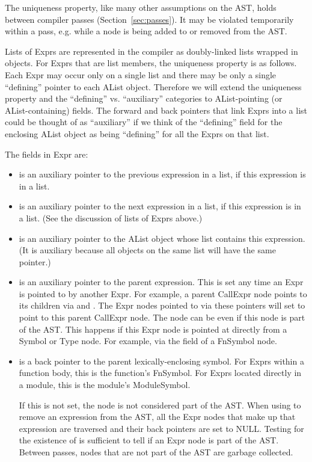 \documentclass[10pt]{article}
\begin{document}
The uniqueness property, like many other assumptions on the AST, holds
between compiler passes (Section~\ref{sec:passes}).  It may be
violated temporarily within a pass, e.g. while a node is being added
to or removed from the AST.

Lists of Exprs are represented in the compiler as doubly-linked lists
wrapped in  objects.  For Exprs that are list members, the
uniqueness property is as follows.  Each Expr may occur only on a
single list and there may be only a single ``defining'' pointer to
each AList object.  Therefore we will extend the uniqueness property
and the ``defining'' vs. ``auxiliary'' categories to AList-pointing
(or AList-containing)
fields.  The forward and back pointers that link Exprs into a list
could be thought of as ``auxiliary'' if we think of the ``defining''
field for the enclosing AList object as being ``defining'' for all
the Exprs on that list.

The fields in Expr are:
\begin{itemize}
\item {} is an auxiliary pointer to the previous expression in
  a list, if this expression is in a list.
\item {} is an auxiliary pointer to the next expression in a list,
  if this expression is in a list. (See the discussion of lists of Exprs above.)
\item {} is an auxiliary pointer to the AList object
  whose list contains this expression.  (It is auxiliary because all
  objects on the same list will have the same  pointer.)
\item {} is an auxiliary pointer to the parent
  expression.  This is set any time an Expr is pointed to by another
  Expr.  For example, a parent CallExpr node points to its children
  via  and .  The Expr nodes pointed to via
  these pointers will set  to point to this parent
  CallExpr node.  The  node can be  even if
  this node is part of the AST.  This happens if this Expr node is
  pointed at directly from a Symbol or Type node.  For example, via
  the  field of a FnSymbol node.
\item {} is a back pointer to the parent
  lexically-enclosing symbol.  For Exprs within a function body,
  this is the function's FnSymbol.  For Exprs located directly in
  a module, this is the module's ModuleSymbol.

  If this is not set, the node is not considered part of the
  AST.  When using  to remove an expression from the AST,
  all the Expr nodes that make up that expression are traversed and
  their  back pointers are set to NULL.  Testing for
  the existence of  is sufficient to tell if an Expr
  node is part of the AST.  Between passes, nodes that are not part of
  the AST are garbage collected.
\end{itemize}
\end{document}
